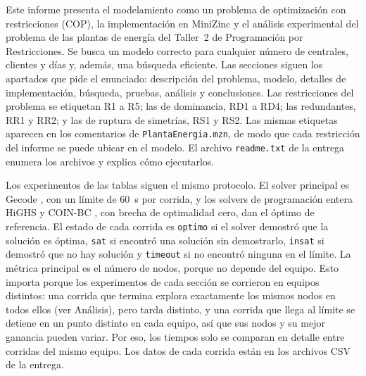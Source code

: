 
Este informe presenta el modelamiento como un problema de optimización con restricciones (COP), la implementación en MiniZinc \parencite{nethercote2007} y el análisis experimental del problema de las plantas de energía del Taller~2 de Programación por Restricciones. Se busca un modelo correcto para cualquier número de centrales, clientes y días y, además, una búsqueda eficiente. Las secciones siguen los apartados que pide el enunciado: descripción del problema, modelo, detalles de implementación, búsqueda, pruebas, análisis y conclusiones. Las restricciones del problema se etiquetan R1 a R5; las de dominancia, RD1 a RD4; las redundantes, RR1 y RR2; y las de ruptura de simetrías, RS1 y RS2. Las mismas etiquetas aparecen en los comentarios de \texttt{PlantaEnergia.mzn}, de modo que cada restricción del informe se puede ubicar en el modelo. El archivo \texttt{readme.txt} de la entrega enumera los archivos y explica cómo ejecutarlos.

Los experimentos de las tablas siguen el mismo protocolo. El solver principal es Gecode \parencite{gecode}, con un límite de 60~s por corrida, y los solvers de programación entera HiGHS \parencite{highs} y COIN-BC \parencite{cbc}, con brecha de optimalidad cero, dan el óptimo de referencia. El estado de cada corrida es \texttt{optimo} si el solver demostró que la solución es óptima, \texttt{sat} si encontró una solución sin demostrarlo, \texttt{insat} si demostró que no hay solución y \texttt{timeout} si no encontró ninguna en el límite. La métrica principal es el número de nodos, porque no depende del equipo. Esto importa porque los experimentos de cada sección se corrieron en equipos distintos: una corrida que termina explora exactamente los mismos nodos en todos ellos (ver Análisis), pero tarda distinto, y una corrida que llega al límite se detiene en un punto distinto en cada equipo, así que sus nodos y su mejor ganancia pueden variar. Por eso, los tiempos solo se comparan en detalle entre corridas del mismo equipo. Los datos de cada corrida están en los archivos CSV de la entrega.
